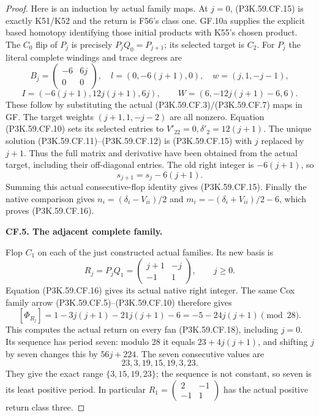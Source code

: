 \begin{proof}
Here is an induction by actual family maps. At \(j=0\), (P3K.59.CF.15)
is exactly K51/K52 and the return is F56's class one. GF.10a
supplies the explicit based homotopy identifying those initial
products with K55's chosen product. The \(C_0\) flip of \(P_j\)
is precisely \(P_jQ_0=P_{j+1}\); its selected target is \(C_2\).
For \(P_j\) the literal complete windings and trace degrees are
\[
 B_j=\begin{pmatrix}-6&6j\\0&0\end{pmatrix},\quad
 l=(0,-6(j+1),0),\quad w=(j,1,-j-1),
\]
\[
 I=(-6(j+1),12j(j+1),6j),\qquad
 W=(6,-12j(j+1)-6,6).                                \tag{P3K.59.CF.17}
\]
These follow by substituting the actual (P3K.59.CF.3)/(P3K.59.CF.7) maps in GF.
The target weights \((j+1,1,-j-2)\) are all nonzero.
Equation (P3K.59.CF.10) sets its selected entries to
\(V'_{22}=0,\delta'_2=12(j+1)\). The unique solution
(P3K.59.CF.11)--\allowbreak (P3K.59.CF.12) is (P3K.59.CF.15) with \(j\) replaced by \(j+1\).
Thus the full matrix and derivative have been obtained from the
actual target, including their off-diagonal entries.
The old right integer is \(-6(j+1)\), so
\[
 s_{j+1}=s_j-6(j+1).
\]
Summing this actual consecutive-flop identity gives (P3K.59.CF.15).
Finally the native comparison gives
\(n_i=(\delta_i-V_{ii})/2\) and
\(m_i=-(\delta_i+V_{ii})/2-6\), which proves (P3K.59.CF.16).

\par\medskip\noindent\textbf{CF.5. The adjacent complete family.}\par\nopagebreak[4]

Flop \(C_1\) on each of the just constructed actual families.
Its new basis is
\[
 R_j=P_jQ_1=\begin{pmatrix}j+1&-j\\-1&1\end{pmatrix},
 \qquad j\ge0.                                       \tag{P3K.59.CF.18}
\]
Equation (P3K.59.CF.16) gives its actual native right integer.
The same Cox family arrow (P3K.59.CF.5)--\allowbreak (P3K.59.CF.10) therefore gives
\[
 [\Phi_{R_j}]=1-3j(j+1)-21j(j+1)-6
             =-5-24j(j+1)\pmod {28}.                 \tag{P3K.59.CF.19}
\]
This computes the actual return on every fan (P3K.59.CF.18), including
\(j=0\). Its sequence has period seven: modulo 28 it equals
\(23+4j(j+1)\), and shifting \(j\) by seven changes this
by \(56j+224\). The seven consecutive values are
\[
                         23,3,19,15,19,3,23 .
\]
They give the exact range \(\{3,15,19,23\}\); the sequence
is not constant, so seven is its least positive period.
In particular
\(R_1=(\begin{smallmatrix}2&-1\\-1&1\end{smallmatrix})\)
has the actual positive return class three.


\end{proof}

